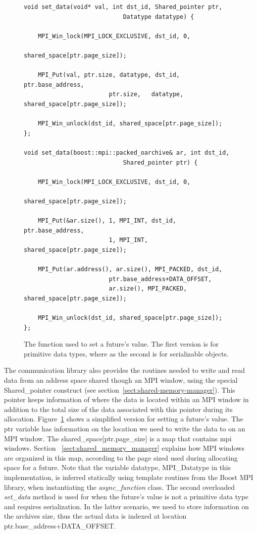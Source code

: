 \begin{figure}[!ht]
\begin{lstlisting}
void set_data(void* val, int dst_id, Shared_pointer ptr, 
							Datatype datatype) {

    MPI_Win_lock(MPI_LOCK_EXCLUSIVE, dst_id, 0, 
								shared_space[ptr.page_size]);

    MPI_Put(val, ptr.size, datatype, dst_id, ptr.base_address, 
						ptr.size,	datatype, shared_space[ptr.page_size]);

    MPI_Win_unlock(dst_id, shared_space[ptr.page_size]);
};

void set_data(boost::mpi::packed_oarchive& ar, int dst_id, 
							Shared_pointer ptr) {

    MPI_Win_lock(MPI_LOCK_EXCLUSIVE, dst_id, 0, 
								shared_space[ptr.page_size]);

    MPI_Put(&ar.size(), 1, MPI_INT, dst_id, ptr.base_address,
						1, MPI_INT, shared_space[ptr.page_size]);

    MPI_Put(ar.address(), ar.size(), MPI_PACKED, dst_id, 
						ptr.base_address+DATA_OFFSET,
						ar.size(), MPI_PACKED, shared_space[ptr.page_size]);

    MPI_Win_unlock(dst_id, shared_space[ptr.page_size]);
};
\end{lstlisting}
\caption{The function used to set a future's value.  The first version is for primitive data types, 
where as the second is for serializable objects.}
\label{lst:set_data}
\end{figure}

The communication library also provides the routines needed to write and read data from an address space shared
though an MPI window, using the special Shared\_pointer construct (see section~\ref{sect:shared-memory-manager}).  
This pointer keeps information of where the data is located within an MPI window in addition to the total size of the data associated with this pointer during its allocation.  Figure~\ref{lst:set_data} shows a simplified version for 
setting a future's value.  The ptr variable has information on the location we need to write the data to on an MPI 
window.  The shared\_space[ptr.page\_size] is a map that contains mpi windows.  Section
~\ref{sect:shared_memory_manager} explains how MPI windows are organized in this map, according to the 
page sized used during allocating space for a future.  Note that the variable datatype, MPI\_Datatype in this
implementation, is inferred statically using template routines from the Boost MPI library,
when instantiating the \emph{async\_function} class.  The second overloaded \emph{set\_data} method is used for
when the future's value is not a primitive data type and requires serialization.  In the latter scenario, we
need to store information on the archives size, thus the actual data is indexed at location 
ptr.base\_address+DATA\_OFFSET.

